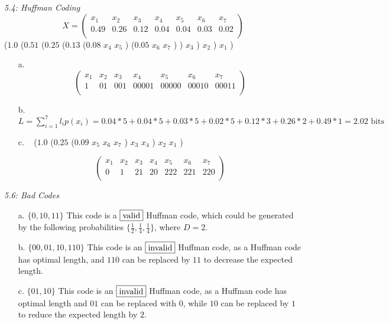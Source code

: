 \documentclass[10pt]{article}
\begin{document}
\begin{tiny}
\begin{multicols}{3}
\textit{5.4: Huffman Coding}
\[
 X =
 \begin{pmatrix}
	x_1 & x_2 & x_3 & x_4 & x_5 & x_6 & x_7 \\
	0.49 & 0.26 & 0.12 & 0.04 & 0.04 & 0.03 & 0.02 \\
 \end{pmatrix}
\]
($1.0$ ($0.51$ ($0.25$ ($0.13$ ($0.08$ $x_4$ $x_5$ ) ($0.05$ $x_6$ $x_7$ ) ) $x_3$ ) $x_2$ ) $x_1$ )
\begin{itemize}
	\item[a.] 
\[
 \begin{pmatrix}
	x_1 & x_2 & x_3 & x_4   & x_5   & x_6   & x_7 \\
	1   & 01  & 001 & 00001 & 00000 & 00010 & 00011 \\
 \end{pmatrix}
\]
	\item[b.] $L = \sum_{i=1}^7 l_i p(x_i) = 0.04*5 + 0.04*5 + 0.03*5 + 0.02*5 + 0.12*3 + 0.26*2 + 0.49*1 = 2.02\textrm{ bits}$

	\item[c.] 
\
($1.0$  ($0.25$ ($0.09$ $x_5$ $x_6$ $x_7$ ) $x_3$ $x_4$ ) $x_2$ $x_1$ )

\[
 \begin{pmatrix}
	x_1 & x_2 & x_3 & x_4 & x_5 & x_6 & x_7 \\
	0   & 1   & 21  & 20  & 222 & 221 & 220 \\
 \end{pmatrix}
\]
\end{itemize}

\textit{5.6: Bad Codes}

\begin{itemize}
	\item[a.] $ \{0, 10, 11 \} $ This code is a $\fbox{valid}$ Huffman code, which could be generated by the following probabilities $\{ \frac{1}{2}, \frac{1}{4}, \frac{1}{4} \}$, where $D=2$.
	\item[b.] $ \{00, 01, 10, 110 \} $ This code is an $\fbox{invalid}$ Huffman code, as a Huffman code has optimal length, and $110$ can be replaced by $11$ to decrease the expected length.  
	\item[c.] $ \{01, 10 \} $ This code is an $\fbox{invalid}$ Huffman code, as a Huffman code has optimal length and $01$ can be replaced with $0$, while $10$ can be replaced by $1$ to reduce the expected length by $2$.
\end{itemize}


\end{multicols}
\end{tiny}
\end{document}
